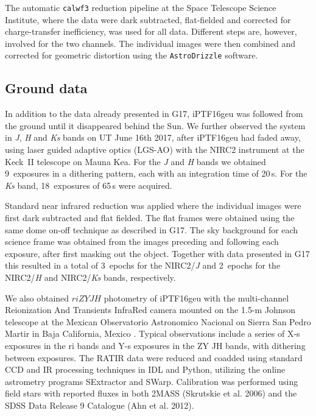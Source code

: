 \documentclass[a4paper,fleqn,usenatbib]{mnras}
\newcommand{\geu}{iPTF16geu\xspace}
\newcommand{\scipap}{G17\xspace}
\newcommand{\wfc}{WFC3\xspace}
\newcommand{\wfcuvis}{WFC3/UVIS\xspace}
\newcommand{\wfcir}{WFC3/IR\xspace}
\newcommand{\uvisaperture}{{\tt UVIS2-C512C-SUB}\xspace}
\newcommand{\iraperture}{{\tt IRSUB512}\xspace}
\newcommand{\jband}{{\it J}\xspace}
\newcommand{\hband}{{\it H}\xspace}
\newcommand{\ksband}{{\it Ks}\xspace}
\begin{document}
\begin{table}
\centering
\caption{Hubble Space Telescope Wide Field Camera 3 data imaging data presented here.  The columns are the civil date, 
the Modified Julian Date (MJD), the HST passband, total exposure time, the number of sub-exposures, and the \wfc camera.  
The \wfcuvis and \wfcir data were obtained with the  \uvisaperture and \iraperture subarray, respectively.  \label{tb:hstimaging}}

\end{table}

The automatic \texttt{calwf3} reduction pipeline at the Space Telescope Science Institute, where the data were dark subtracted, 
flat-fielded and corrected for charge-transfer inefficiency, was used for all data. Different steps are, however, involved for the two
channels.  The individual images were then combined and corrected for geometric distortion using the \texttt{AstroDrizzle} software.

\subsection{Ground data}
In addition to the data already presented in \scipap, \geu was followed from the ground until it disappeared behind the Sun. We further observed the system in \jband, \hband and \ksband bands on UT June 16th 2017, after \geu had faded away, 
using laser guided adaptive optics (LGS-AO) with the NIRC2 instrument at the Keck~II telescope on Mauna Kea.  For the 
\jband and \hband bands we obtained 9~exposures in a dithering pattern, each with an integration time of 20\,s.  For the \ksband band, 
18~exposures of 65\,s were acquired. 

Standard near infrared reduction was applied where the individual images were first dark subtracted and flat fielded.  The flat 
frames were obtained using the same dome on-off technique as described in \scipap.  The sky background for each science 
frame was obtained from the images preceding and following each exposure, after first masking out the object.  
Together with data presented in \scipap this resulted in a total of 3~epochs for the NIRC2/\jband and 2~epochs for the 
NIRC2/\hband and NIRC2/\ksband bands, respectively.

We also obtained $riZYJH$ photometry of iPTF16geu with the multi-channel Reionization And Transients InfraRed camera \citep[RATIR;][]{butler2012} mounted on the 1.5-m Johnson telescope at the Mexican Observatorio Astronomico Nacional on Sierra San Pedro Martir in Baja California, Mexico \citep{watson2012}. Typical observations include a series of X-s exposures in the ri bands and Y-s exposures in the ZY JH bands, with dithering between exposures. 
The RATIR data were reduced and coadded using standard CCD and IR processing techniques in IDL and Python, utilizing the online astrometry programs SExtractor and SWarp. Calibration was performed using field stars with reported fluxes in both 2MASS (Skrutskie et al. 2006) and the SDSS Data Release 9 Catalogue (Ahn et al. 2012). %
\end{document}
